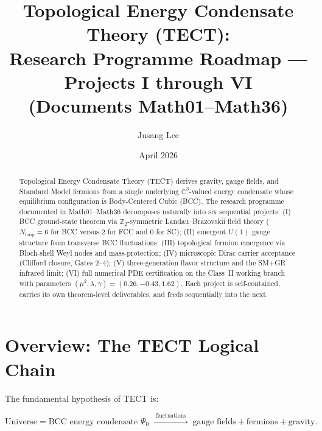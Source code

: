\documentclass[reprint,aps,pre,onecolumn,superscriptaddress,amsmath,amssymb]{revtex4-2}
\newcommand{\Nloop}{N_{\mathrm{loop}}}
\begin{document}
\title{Topological Energy Condensate Theory (TECT):\\
  Research Programme Roadmap --- Projects I through VI\\
  (Documents Math01--Math36)}

\author{Jusang Lee}

\date{April 2026}

\begin{abstract}
Topological Energy Condensate Theory (TECT) derives gravity, gauge fields, and Standard
Model fermions from a single underlying $\mathbb{C}^{3}$-valued energy condensate whose
equilibrium configuration is Body-Centered Cubic (BCC).
The research programme documented in Math01--Math36 decomposes naturally into six
sequential projects:
(I) BCC ground-state theorem via $\mathbb{Z}_{2}$-symmetric Landau--Brazovskii field
theory ($\Nloop = 6$ for BCC versus $2$ for FCC and $0$ for SC);
(II) emergent $U(1)$ gauge structure from transverse BCC fluctuations;
(III) topological fermion emergence via Bloch-shell Weyl nodes and mass-protection;
(IV) microscopic Dirac carrier acceptance (Clifford closure, Gates 2--4);
(V) three-generation flavor structure and the SM$+$GR infrared limit;
(VI) full numerical PDE certification on the Class~II working branch with parameters
$(\mu^{2},\lambda,\gamma)=(0.26,-0.43,1.62)$.
Each project is self-contained, carries its own theorem-level deliverables, and feeds
sequentially into the next.
\end{abstract}

\maketitle

\section{Overview: The TECT Logical Chain}
\label{sec:overview}

The fundamental hypothesis of TECT is:

\begin{equation}
  \boxed{
    \text{Universe} = \text{BCC energy condensate } \Psi_{0}
    \;\xrightarrow{\;\text{fluctuations}\;}\;
    \text{gauge fields} + \text{fermions} + \text{gravity}.
  }
  \label{eq:master-chain}
\end{equation}
\end{document}
